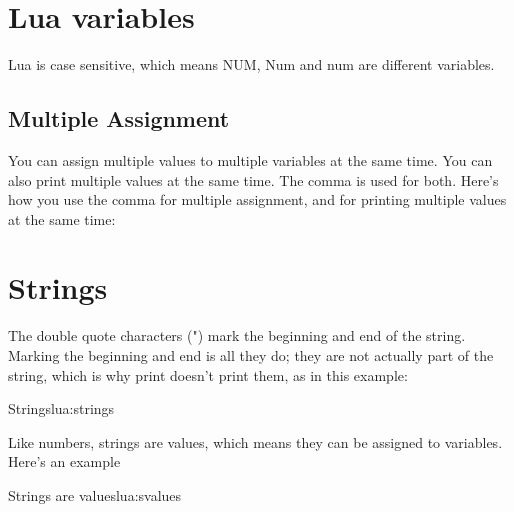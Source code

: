 \section{Lua variables}

\begin{tcblisting}{}
\end{tcblisting}

Lua is case sensitive, which means NUM, Num and num are different variables.

\begin{tcblisting}{}
\end{tcblisting}


\subsection{Multiple Assignment}

You can assign multiple values to multiple variables at the same time. You can also print multiple values
at the same time. The comma is used for both. Here’s how you use the comma for multiple assignment,
and for printing multiple values at the same time:

\begin{tcblisting}{}
\end{tcblisting}



\section{Strings}
The double quote characters (") mark the beginning and end of the string. Marking the beginning and
end is all they do; they are not actually part of the string, which is why print doesn't print them, as in
this example:

\begin{texexample}{Strings}{lua:strings}
\end{texexample}

Like numbers, strings are values, which means they can be assigned to variables. Here's an example

\begin{texexample}{Strings are values}{lua:svalues}
\end{texexample}

